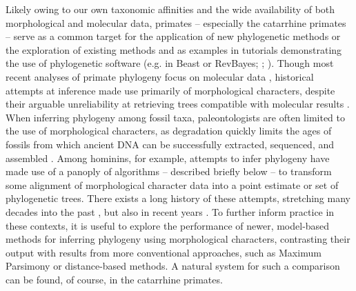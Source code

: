 Likely owing to our own taxonomic affinities and the wide availability of both morphological and molecular data, primates -- especially the catarrhine primates --  serve as a common target for the application of new phylogenetic methods or the exploration of existing methods \citep[e.g.][]{reisUsingPhylogenomicData2018} and as examples in tutorials demonstrating the use of phylogenetic software (e.g. in Beast or RevBayes; \citealt{bouckaertBEASTAdvancedSoftware2019}; \citealt{hohnaRevBayesBayesianPhylogenetic2016a}). Though most recent analyses of primate phylogeny focus on molecular data \citep[e.g.][]{perelmanMolecularPhylogenyLiving2011, springerMacroevolutionaryDynamicsHistorical2012}, historical attempts at inference made use primarily of morphological characters, despite their arguable unreliability at retrieving trees compatible with molecular results \citep[e.g.][]{collardHowReliableAre2000, gibbsSofttissueCharactersHigher2000, varon-gonzalezEstimatingPhylogeniesShape2020}. When inferring phylogeny among fossil taxa, paleontologists are often limited to the use of morphological characters, as degradation quickly limits the ages of fossils from which ancient DNA can be successfully extracted, sequenced, and assembled \citep{collinsSurvivalOrganicMatter2002, allentoftHalflifeDNABone2012, pickrellNewHistoryGeography2014}. Among hominins, for example, attempts to infer phylogeny have made use of a panoply of algorithms -- described briefly below -- to transform some alignment of morphological character data into a point estimate or set of phylogenetic trees. There exists a long history of these attempts, stretching many decades into the past \citep[e.g.][]{chamberlainEarlyHominidPhylogeny1987, stringerNumericalCladisticAnalysis1987, skeltonEvolutionaryRelationshipsEarly1992, straitReappraisalEarlyHominid1997}, but also in recent years \citep[e.g.][]{irishDentalMorphologyPhylogenetic2013, demboBayesianAnalysisMorphological2015, demboEvolutionaryRelationshipsAge2016, argueAffinitiesHomoFloresiensis2017}. To further inform practice in these contexts, it is useful to explore the performance of newer, model-based methods for inferring phylogeny using morphological characters, contrasting their output with results from more conventional approaches, such as Maximum Parsimony or distance-based methods. A natural system for such a comparison can be found, of course, in the catarrhine primates.


